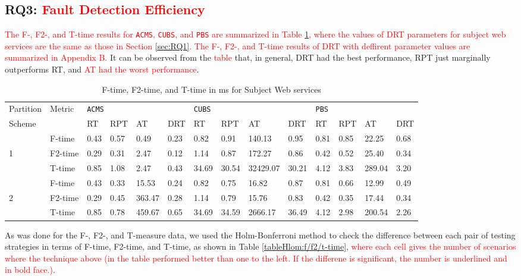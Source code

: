 \documentclass[10pt,journal,compsoc]{IEEEtran}
\begin{document}
\subsection{RQ3: \textcolor{red}{Fault Detection Efficiency}}
\label{sec:RQ3}

\textcolor{red}{The F-, F2-, and T-time results for \texttt{ACMS}, \texttt{CUBS}, and \texttt{PBS} are summarized in Table \ref{tab:time}, where the values of DRT parameters for subject web services are the same as those in Section \ref{sec:RQ1}. The F-, F2-, and T-time results of DRT with deffirent parameter values are summarized in Appendix B.} It can be observed from the \textcolor{red}{table} that, in general, DRT had the best performance, RPT just marginally outperforms RT, and \textcolor{red}{AT had the worst performance}.


\begin{table}
	\caption{F-time, F2-time, and T-time in ms for Subject Web services}
	\centering
	\label{tab:time}
	\begin{tabular}{llllllllllllll}
	\toprule
	Partition&\multirow{2}{*}{Metric}&\multicolumn{4}{l}{\texttt{ACMS}}&\multicolumn{4}{l}{\texttt{CUBS}}&\multicolumn{4}{l}{\texttt{PBS}} \\ \cmidrule(lr){3-6} \cmidrule(lr){7-10} \cmidrule(lr){11-14}
	Scheme   &        &RT  &RPT   &AT     &DRT    &RT   &RPT   &AT      &DRT   &RT  &RPT   &AT    &DRT  \\ \midrule
	         &F-time  &0.43&0.57  &0.49   &0.23   &0.82 &0.91  &140.13  &0.95  &0.81&0.85  &22.25 &0.68 \\
	1        &F2-time &0.29&0.31  &2.47   &0.12   &1.14 &0.87  &172.27  &0.86  &0.42&0.52  &25.40 &0.34 \\
	         &T-time  &0.85&1.08  &2.47   &0.43   &34.69&30.54 &32429.07&30.21 &4.12&3.83  &289.04&3.20 \\ \midrule
	         &F-time  &0.43&0.33  &15.53  &0.24   &0.82 &0.75  &16.82   &0.87  &0.81&0.66  &12.99 &0.49 \\
	2        &F2-time &0.29&0.45  &363.47 &0.28   &1.14 &0.79  &15.76   &0.83  &0.42&0.35  &17.44 &0.34 \\
	         &T-time  &0.85&0.78  &459.67 &0.65   &34.69&34.59 &2666.17 &36.49 &4.12&2.98  &200.54&2.26 \\
	\bottomrule 
	\end{tabular}
\end{table}




As was done for the F-, F2-, and T-measure data, we used the Holm-Bonferroni method to check the difference between each pair of testing strategies in terms of F-time, F2-time, and T-time, as shown in Table \ref{tableHlom:f/f2/t-time}, \textcolor{red}{where each cell gives the number of scenarios where the technique above (in the table performed better than one to the left. If the differene is significant, the number is underlined and in bold face.)}.
\end{document}
